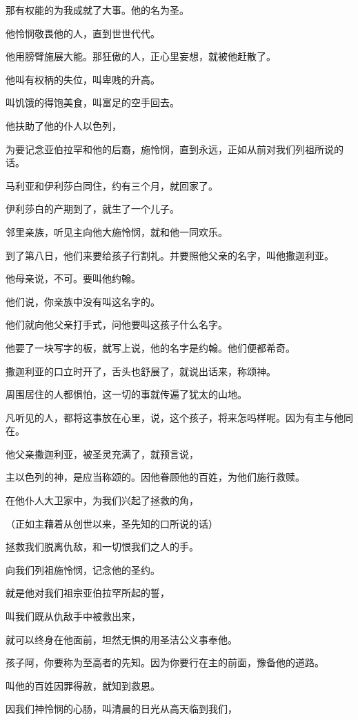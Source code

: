 \documentclass[12pt,oneside]{book}
\begin{document}
那有权能的为我成就了大事。他的名为圣。

他怜悯敬畏他的人，直到世世代代。

他用膀臂施展大能。那狂傲的人，正心里妄想，就被他赶散了。

他叫有权柄的失位，叫卑贱的升高。

叫饥饿的得饱美食，叫富足的空手回去。

他扶助了他的仆人以色列，

为要记念亚伯拉罕和他的后裔，施怜悯，直到永远，正如从前对我们列祖所说的话。

马利亚和伊利莎白同住，约有三个月，就回家了。

伊利莎白的产期到了，就生了一个儿子。

邻里亲族，听见主向他大施怜悯，就和他一同欢乐。

到了第八日，他们来要给孩子行割礼。并要照他父亲的名字，叫他撒迦利亚。

他母亲说，不可。要叫他约翰。

他们说，你亲族中没有叫这名字的。

他们就向他父亲打手式，问他要叫这孩子什么名字。

他要了一块写字的板，就写上说，他的名字是约翰。他们便都希奇。

撒迦利亚的口立时开了，舌头也舒展了，就说出话来，称颂神。

周围居住的人都惧怕，这一切的事就传遍了犹太的山地。

凡听见的人，都将这事放在心里，说，这个孩子，将来怎吗样呢。因为有主与他同在。

他父亲撒迦利亚，被圣灵充满了，就预言说，

主以色列的神，是应当称颂的。因他眷顾他的百姓，为他们施行救赎。

在他仆人大卫家中，为我们兴起了拯救的角，

（正如主藉着从创世以来，圣先知的口所说的话）

拯救我们脱离仇敌，和一切恨我们之人的手。

向我们列祖施怜悯，记念他的圣约。

就是他对我们祖宗亚伯拉罕所起的誓，

叫我们既从仇敌手中被救出来，

就可以终身在他面前，坦然无惧的用圣洁公义事奉他。

孩子阿，你要称为至高者的先知。因为你要行在主的前面，豫备他的道路。

叫他的百姓因罪得赦，就知到救恩。

因我们神怜悯的心肠，叫清晨的日光从高天临到我们，
\end{document}
